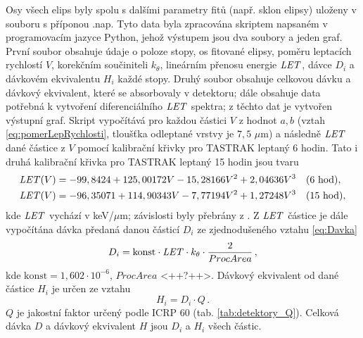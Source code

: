 Osy všech elips byly spolu s dalšími parametry fitů (např. sklon elipsy) uloženy v souboru s příponou .nap. Tyto data byla zpracována skriptem napsaném v programovacím jazyce Python, jehož výstupem jsou dva soubory a jeden graf. První soubor obsahuje údaje o poloze stopy, os fitované elipsy, poměru leptacích rychlostí $V$, korekčním součiniteli $k_{\theta}$, lineárním přenosu energie $\mathit{LET}$, dávce $D_i$ a dávkovém ekvivalentu $H_i$ každé stopy. Druhý soubor obsahuje celkovou dávku a dávkový ekvivalent, které se absorbovaly v detektoru; dále obsahuje data potřebná k vytvoření diferenciálního $\mathit{LET}$ spektra; z těchto dat je vytvořen výstupní graf. Skript vypočítává pro každou částici $V$ z hodnot $a,b$ (vztah \eqref{eq:pomerLepRychlosti}, tloušťka odleptané vrstvy je $7,5$
$\mu$m) a následně $\mathit{LET}$ dané částice z $V$ pomocí kalibrační křivky pro TASTRAK leptaný 6 hodin. Tato i druhá kalibrační křivka pro TASTRAK leptaný 15 hodin jsou tvaru
\begin{align}
  \mathit{LET}(V) &= -99,8424+125,00172  V-15,28166  V^2+2,04636  V^3\quad\text{(6 hod)},\label{eq:kalibracniKrivkaSestHod}\\
  \mathit{LET}(V) &= -96,35071+114,90343  V-7,77194  V^2+1,27248  V^3\quad\text{(15 hod)},\label{eq:kalibracniKrivkaPatnactHod}
\end{align}
kde $\mathit{LET}$ vychází v keV/$\mu$m; závislosti byly přebrány z \cite{ssntd}. Z $\mathit{LET}$ částice je dále vypočítána dávka předaná danou částicí $D_i$ ze zjednodušeného vztahu \eqref{eq:Davka} 
\begin{equation}
  D_i=\text{konst}\cdot\mathit{LET}\cdot k_{\theta}\cdot\frac{2}{ProcArea}\,, 
  \label{eq:praktickaCast_davkaJednaCastice}
\end{equation}
kde $\text{konst}=1,602\cdot 10^{-6}$, $ProcArea$ <++?++>. Dávkový ekvivalent od dané částice $H_i$ je určen ze vztahu 
\begin{equation}
  H_i=D_i\cdot Q\,.
  \label{eq:praktickaCast_ekvDavkaJednaCastice}
\end{equation}
$Q$ je jakostní faktor určený podle ICRP 60 (tab. \ref{tab:detektory_Q}). Celková dávka $D$ a dávkový ekvivalent $H$ jsou $D_i$ a $H_i$ všech částic. 

